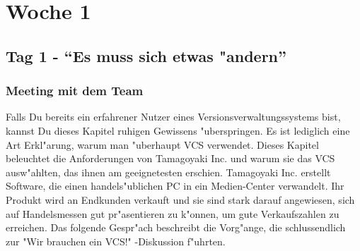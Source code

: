 \chapter{Woche 1}
\section{Tag 1 - ``Es muss sich etwas "andern''}
\subsection{Meeting mit dem Team}

Falls Du bereits ein erfahrener Nutzer eines Versionsverwaltungssystems bist, kannst Du dieses Kapitel ruhigen Gewissens "uberspringen. Es ist lediglich eine Art
Erkl"arung, warum man "uberhaupt VCS verwendet. Dieses Kapitel beleuchtet die Anforderungen von Tamagoyaki Inc. und warum sie das VCS ausw"ahlten, das ihnen am
geeignetesten erschien. Tamagoyaki Inc. erstellt Software, die einen handels"ublichen PC in ein Medien-Center verwandelt. Ihr Produkt wird an Endkunden verkauft und
sie sind stark darauf angewiesen, sich auf Handelsmessen gut pr"asentieren zu k"onnen, um gute Verkaufszahlen zu erreichen. Das folgende Gespr"ach beschreibt die
Vorg"ange, die schlussendlich zur "Wir brauchen ein VCS!" -Diskussion f"uhrten. 

